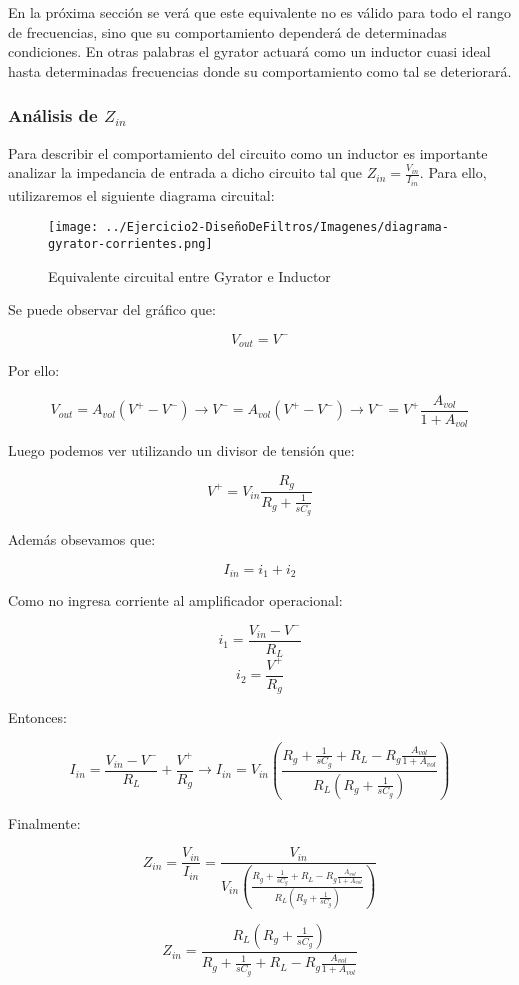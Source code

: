 En la próxima sección se verá que este equivalente no es válido para todo el rango de frecuencias, sino que su comportamiento dependerá de 
determinadas condiciones. En otras palabras el gyrator actuará como un inductor cuasi ideal hasta determinadas frecuencias donde su comportamiento 
como tal se deteriorará.

\subsubsection{Análisis de $Z_{in}$}

Para describir el comportamiento del circuito como un inductor es importante 
analizar la impedancia de entrada a dicho circuito tal que $Z_{in}=\frac{V_{in}}{I_{in}}$. 
Para ello, utilizaremos el siguiente diagrama circuital:

\begin{figure}[H]
    \centering
    \texttt{[image: ../Ejercicio2-DiseñoDeFiltros/Imagenes/diagrama-gyrator-corrientes.png]}
    \caption{Equivalente circuital entre Gyrator e Inductor}
\end{figure}

Se puede observar del gráfico que:

$$V_{out}=V^-$$

Por ello:

$$V_{out}=A_{vol}(V^+-V^-) \longrightarrow V^-=A_{vol}(V^+-V^-) 
\longrightarrow V^-= V^+ \frac{A_{vol}}{1+A_{vol}}$$

Luego podemos ver utilizando un divisor de tensión que:

$$V^+= V_{in}\frac{R_g}{R_g+\frac{1}{sC_g}}$$

Además obsevamos que:

$$I_{in}=i_1+i_2$$

Como no ingresa corriente al amplificador operacional:

$$i_1=\frac{V_{in}-V^-}{R_L}$$
$$i_2=\frac{V^+}{R_g}$$

Entonces:

$$I_{in}=\frac{V_{in}-V^-}{R_L}+\frac{V^+}{R_g} \longrightarrow 
I_{in}=V_{in}(\frac{R_g+\frac{1}{sC_g}+R_L-R_g\frac{A_{vol}}{1+A_{vol}}}{R_L(R_g+\frac{1}{sC_g})})$$

Finalmente:

$$Z_{in}=\frac{V_{in}}{I_{in}}=\frac{V_{in}}{V_{in}(\frac{R_g+\frac{1}{sC_g}+R_L-R_g\frac{A_{vol}}{1+A_{vol}}}{R_L(R_g+\frac{1}{sC_g})})}$$

$$Z_{in}=\frac{R_L(R_g+\frac{1}{sC_g})}{R_g+\frac{1}{sC_g}+R_L-R_g\frac{A_{vol}}{1+A_{vol}}}$$

